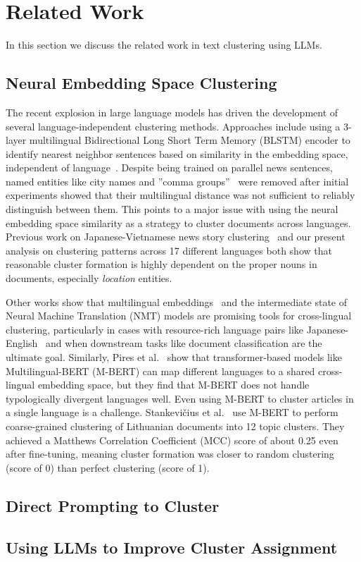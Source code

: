 \section{Related Work}\label{section:related_work}

In this section we discuss the related work in text clustering using LLMs.

\subsection{Neural Embedding Space Clustering} 
The recent explosion in large language models has driven the development of several language-independent clustering methods. Approaches include using a 3-layer multilingual Bidirectional Long Short Term Memory (BLSTM) encoder to identify nearest neighbor sentences based on similarity in the embedding space, independent of language~\cite{Schw18}. Despite being trained on parallel news sentences, named entities like city names and ''comma groups''~\cite{Lieb10b} were removed after initial experiments showed that their multilingual distance was not sufficient to reliably distinguish between them. This points to a major issue with using the neural embedding space similarity as a strategy to cluster documents across languages. Previous work on Japanese-Vietnamese news story clustering~\cite{Hong17} and our present analysis on clustering patterns across 17 different languages both show that reasonable cluster formation is highly dependent on the proper nouns in documents, especially \emph{location} entities. 

Other works show that multilingual embeddings~\cite{Amma18} and the intermediate state of Neural Machine Translation (NMT) models are promising tools for cross-lingual clustering, particularly in cases with resource-rich language pairs like Japanese-English~\cite{Seki18} and when downstream tasks like document classification are the ultimate goal. %
Similarly, Pires et al.~\cite{Pire19} show that transformer-based models like Multilingual-BERT (M-BERT) can map different languages to a shared cross-lingual embedding space, but they find that M-BERT does not handle typologically divergent languages well.
Even using M-BERT to cluster articles in a single language is a challenge. Stankevičius et al.~\cite{Stan20} use M-BERT to perform coarse-grained clustering of Lithuanian documents into 12 topic clusters. They achieved a Matthews Correlation Coefficient (MCC) score of about 0.25 even after fine-tuning, meaning cluster formation was closer to random clustering (score of 0) than perfect clustering (score of 1).

\subsection{Direct Prompting to Cluster}



\subsection{Using LLMs to Improve Cluster Assignment}

